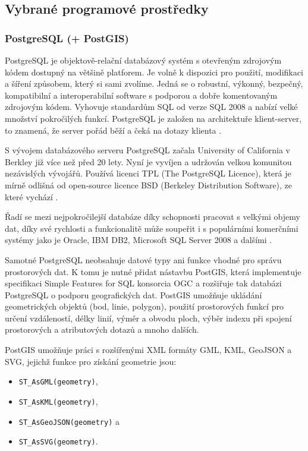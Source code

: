 \subsection{Vybrané programové prostředky}
\label{kPouziteProstredky}

\subsubsection{PostgreSQL (+ PostGIS)}
        \label{kPostgreSQL}

PostgreSQL je objektově-relační databázový systém s otevřeným zdrojovým kódem dostupný na většině platforem. Je volně k dispozici pro použití, modifikaci a šíření způsobem, který si sami zvolíme. Jedná se o robustní, výkonný, bezpečný, kompatibilní a interoperabilní software s podporou a dobře komentovaným zdrojovým kódem. Vyhovuje standardům SQL od verze SQL 2008 a nabízí velké množství pokročilých funkcí. PostgreSQL je založen na architektuře klient-server, to znamená, že server pořád běží a čeká na dotazy klienta \citep{Momjian2001}. 

S vývojem databázového serveru PostgreSQL začala University of California v Berkley již více než před 20 lety. Nyní je vyvíjen a udržován velkou komunitou nezávislých vývojářů. Používá licenci TPL (The PostgreSQL Licence), která je mírně odlišná od open-source licence BSD (Berkeley Distribution Software), ze které vychází \citep{RiggsKrossing2010}.

Řadí se mezi nejpokročilejší databáze díky schopnosti pracovat s velkými objemy dat, díky své rychlosti a funkcionalitě může soupeřit i s populárními komerčními systémy jako je Oracle, IBM DB2, Microsoft SQL Server 2008 a dalšími \citep{PostgreSQL2012}.

Samotné PostgreSQL neobsahuje datové typy ani funkce vhodné pro správu prostorových dat. K tomu je nutné přidat nástavbu PostGIS, která implementuje specifikaci Simple Features for SQL konsorcia OGC a rozšiřuje tak databázi PostgreSQL o podporu geografických dat. PostGIS umožňuje ukládání geometrických objektů (bod, linie, polygon), použití prostorových funkcí pro určení vzdáleností, délky linií, výměr a obvodu ploch, výběr indexu při spojení prostorových a atributových dotazů a mnoho dalších.

PostGIS umožňuje práci s rozšířenými XML formáty GML, KML, GeoJSON a SVG, jejichž funkce pro získání geometrie jsou:
\begin{itemize}
\item \texttt{ST\_AsGML(geometry)},
\item \texttt{ST\_AsKML(geometry)},
\item \texttt{ST\_AsGeoJSON(geometry)} a 
\item \texttt{ST\_AsSVG(geometry)}.
\end{itemize}

